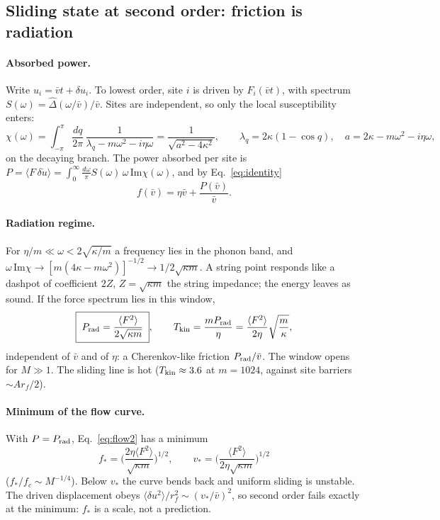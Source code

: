 \documentclass[10pt,a4paper]{article}
\newcommand{\fcs}{f_c}
\begin{document}
\subsection{Sliding state at second order: friction is radiation}

\paragraph{Absorbed power.}
Write $u_i=\bar vt+\delta u_i$. To lowest order, site $i$ is driven by $F_i(\bar vt)$, with spectrum $S(\omega)=\hat\Delta(\omega/\bar v)/\bar v$.
Sites are independent, so only the local susceptibility enters:
\begin{equation}
\chi(\omega)=\int_{-\pi}^{\pi}\frac{dq}{2\pi}\,\frac{1}{\lambda_q-m\omega^2-i\eta\omega}=\frac{1}{\sqrt{a^2-4\kappa^2}},\qquad \lambda_q=2\kappa(1-\cos q),\quad a=2\kappa-m\omega^2-i\eta\omega,
\end{equation}
on the decaying branch.
The power absorbed per site is $P=\langle F\,\delta\dot u\rangle=\int_0^\infty\frac{d\omega}{\pi}S(\omega)\,\omega\,\mathrm{Im}\chi(\omega)$, and by Eq.~\eqref{eq:identity}
\begin{equation}
f(\bar v)=\eta\bar v+\frac{P(\bar v)}{\bar v}.
\label{eq:flow2}
\end{equation}

\paragraph{Radiation regime.}
For $\eta/m\ll\omega<2\sqrt{\kappa/m}$ a frequency lies in the phonon band, and
$\omega\,\mathrm{Im}\chi\to[m(4\kappa-m\omega^2)]^{-1/2}\to1/2\sqrt{\kappa m}$.
A string point responds like a dashpot of coefficient $2Z$, $Z=\sqrt{\kappa m}$ the string impedance; the energy leaves as sound.
If the force spectrum lies in this window,
\begin{equation}
\boxed{\;P_{\rm rad}=\frac{\langle F^2\rangle}{2\sqrt{\kappa m}}\;},\qquad T_{\rm kin}=\frac{mP_{\rm rad}}{\eta}=\frac{\langle F^2\rangle}{2\eta}\sqrt{\frac{m}{\kappa}},
\end{equation}
independent of $\bar v$ and of $\eta$: a Cherenkov-like friction $P_{\rm rad}/\bar v$. The window opens for $M\gg1$. The sliding line is hot ($T_{\rm kin}\approx3.6$ at $m=1024$, against site barriers $\sim Ar_f/2$).

\paragraph{Minimum of the flow curve.}
With $P=P_{\rm rad}$, Eq.~\eqref{eq:flow2} has a minimum
\begin{equation}
\boxed{\;f_*=\Big(\frac{2\eta\langle F^2\rangle}{\sqrt{\kappa m}}\Big)^{1/2},\qquad v_*=\Big(\frac{\langle F^2\rangle}{2\eta\sqrt{\kappa m}}\Big)^{1/2}\;}
\end{equation}
($f_*/\fcs\sim M^{-1/4}$). Below $v_*$ the curve bends back and uniform sliding is unstable.
The driven displacement obeys $\langle\delta u^2\rangle/r_f^2\sim(v_*/\bar v)^2$, so second order fails exactly at the minimum: $f_*$ is a scale, not a prediction.
\end{document}
